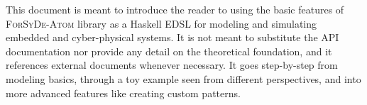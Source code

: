This document is meant to introduce the reader to using the basic features of \textsc{ForSyDe-Atom} library as a Haskell EDSL for modeling and simulating embedded and cyber-physical systems. It is not meant to substitute the API documentation nor provide any detail on the theoretical foundation, and it references external documents whenever necessary. It goes step-by-step from modeling basics, through a toy example seen from different perspectives, and into more advanced features like creating custom patterns.